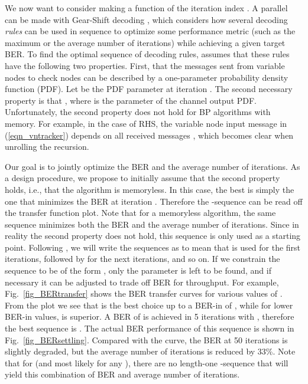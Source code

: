 \documentclass[12pt,journal,twoside,draftcls,onecolumn]{IEEEtran}
\begin{document}
	
We now want to consider making  a function of the iteration index . A parallel can be made with Gear-Shift decoding \cite{ardakani:2006}, which considers how several decoding \emph{rules} can be used in sequence to optimize some performance metric (such as the maximum or the average number of iterations) while achieving a given target BER.
To find the optimal sequence of decoding rules, \cite{ardakani:2006} assumes that these rules have the following two properties. First, that the messages sent from variable nodes to check nodes can be described by a one-parameter probability density function (PDF). Let  be the PDF parameter at iteration . The second necessary property is that , where  is the parameter of the channel output PDF.
Unfortunately, the second property does not hold for BP algorithms with memory. For example, in the case of RHS, the variable node input message  in (\ref{eqn_vntracker}) depends on all received messages , which becomes clear when unrolling the recursion.

Our goal is to jointly optimize the BER and the average number of iterations.
As a design procedure, we propose to initially assume that the second property holds, i.e., that the algorithm is memoryless. 
In this case, the best  is simply the one that minimizes the BER at iteration . Therefore the -sequence can be read off the transfer function plot. Note that for a memoryless algorithm, the same sequence minimizes both the BER and the average number of iterations.
Since in reality the second property does not hold, this sequence is only used as a starting point. Following \cite{ardakani:2006}, we will write the sequences as  to mean that  is used for the first  iterations, followed by  for the next  iterations, and so on. If we constrain the sequence to be of the form , only the parameter  is left to be found, and if necessary it can be adjusted to trade off BER for throughput.
For example, Fig.~\ref{fig_BERtransfer} shows the BER transfer curves for various values of . From the plot we see that  is the best choice up to a BER-in of , while for lower BER-in values,  is superior. A BER of  is achieved in 5 iterations with , therefore the best sequence is . The actual BER performance of this sequence is shown in Fig.~\ref{fig_BERsettling}. Compared with the  curve, the BER at 50 iterations is slightly degraded, but the average number of iterations is reduced by 33\%.
Note that for  (and most likely for any ), there are no length-one -sequence that will yield this combination of BER and average number of iterations.
\end{document}
